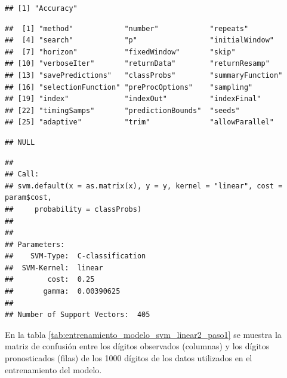 \documentclass[12pt,spanish,a4paper]{article}
\newenvironment{Shaded}{\begin{snugshade}}{\end{snugshade}}
\newcommand{\KeywordTok}[1]{\textcolor[rgb]{0.13,0.29,0.53}{\textbf{#1}}}
\newcommand{\OperatorTok}[1]{\textcolor[rgb]{0.81,0.36,0.00}{\textbf{#1}}}
\newcommand{\NormalTok}[1]{#1}
\numberwithin{equation}{section}
\begin{document}
\begin{verbatim}
## [1] "Accuracy"
\end{verbatim}

\begin{Shaded}
\end{Shaded}

\begin{verbatim}
##  [1] "method"            "number"            "repeats"          
##  [4] "search"            "p"                 "initialWindow"    
##  [7] "horizon"           "fixedWindow"       "skip"             
## [10] "verboseIter"       "returnData"        "returnResamp"     
## [13] "savePredictions"   "classProbs"        "summaryFunction"  
## [16] "selectionFunction" "preProcOptions"    "sampling"         
## [19] "index"             "indexOut"          "indexFinal"       
## [22] "timingSamps"       "predictionBounds"  "seeds"            
## [25] "adaptive"          "trim"              "allowParallel"
\end{verbatim}

\begin{Shaded}
\end{Shaded}

\begin{verbatim}
## NULL
\end{verbatim}

\begin{Shaded}
\end{Shaded}

\begin{verbatim}
## 
## Call:
## svm.default(x = as.matrix(x), y = y, kernel = "linear", cost = param$cost, 
##     probability = classProbs)
## 
## 
## Parameters:
##    SVM-Type:  C-classification 
##  SVM-Kernel:  linear 
##        cost:  0.25 
##       gamma:  0.00390625 
## 
## Number of Support Vectors:  405
\end{verbatim}

En la tabla \ref{tab:entrenamiento_modelo_svm_linear2_paso1} se muestra
la matriz de confusión entre los dígitos observados (columnas) y los
dígitos pronosticados (filas) de los 1000 dígitos de los datos
utilizados en el entrenamiento del modelo.
\end{document}

